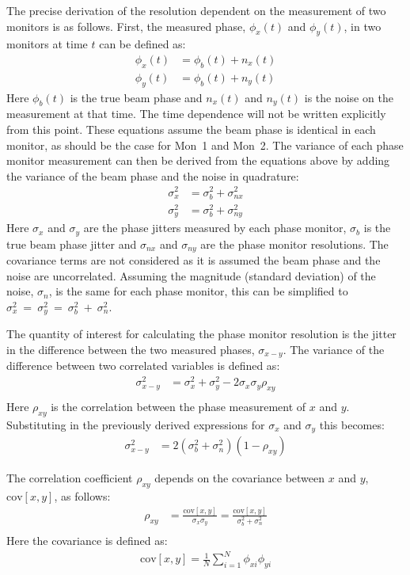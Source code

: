 The precise derivation of the resolution dependent on the measurement of two monitors is as follows. First, the measured phase, \(\phi_x(t)\) and \(\phi_y(t)\), in two monitors at time \(t\) can be defined as:
\begin{align}
\phi_x(t) &= \phi_b(t) + n_x(t) \label{e:resEq1} \\
\phi_y(t) &= \phi_b(t) + n_y(t) \label{e:resEq2}
\end{align}
Here \(\phi_b(t)\) is the true beam phase and \(n_x(t)\) and \(n_y(t)\) is the noise on the measurement at that time. The time dependence will not be written explicitly from this point. These equations assume the beam phase is identical in each monitor, as should be the case for Mon~1 and Mon~2. The variance of each phase monitor measurement can then be derived from the equations above by adding the variance of the beam phase and the noise in quadrature:
\begin{align}
\sigma_x^2 &= \sigma_b^2 + \sigma_{nx}^2 \label{e:measJitWithRes} \\
\sigma_y^2 &= \sigma_b^2 + \sigma_{ny}^2
\end{align}
Here \(\sigma_x\) and \(\sigma_y\) are the phase jitters measured by each phase monitor, \(\sigma_b\) is the true beam phase jitter and \(\sigma_{nx}\) and \(\sigma_{ny}\) are the phase monitor resolutions. The covariance terms are not considered as it is assumed the beam phase and the noise are uncorrelated. Assuming the magnitude (standard deviation) of the noise, \(\sigma_n\), is the same for each phase monitor, this can be simplified to \(\sigma_x^2~=~\sigma_y^2~=~\sigma_b^2~+~\sigma_n^2\).

The quantity of interest for calculating the phase monitor resolution is the jitter in the difference between the two measured phases, \(\sigma_{x-y}\). The variance of the difference between two correlated variables is defined as:
\begin{align}
\sigma_{x-y}^2 &= \sigma_x^2 + \sigma_y^2 - 2\sigma_x\sigma_y\rho_{xy} \\
\end{align}
Here \(\rho_{xy}\) is the correlation between the phase measurement of \(x\) and \(y\). Substituting in the previously derived expressions for \(\sigma_x\) and \(\sigma_y\) this becomes:
\begin{align}
\sigma_{x-y}^2 &= 2(\sigma_b^2 + \sigma_n^2)(1-\rho_{xy})
\end{align}

The correlation coefficient \(\rho_{xy}\) depends on the covariance between \(x\) and \(y\), \(\mathrm{cov}[x,y]\), as follows:
\begin{align}
\rho_{xy} &= \frac{\mathrm{cov}[x,y]}{\sigma_x\sigma_y} = \frac{\mathrm{cov}[x,y]}{\sigma_b^2+\sigma_n^2} \\
\end{align}
Here the covariance is defined as:
\begin{align}
\mathrm{cov}[x,y] = \frac{1}{N}\sum_{i=1}^{N}\phi_{xi}\phi_{yi} \\
\end{align}

